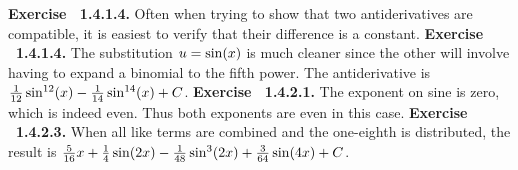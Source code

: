  {\noindent \protect \bf  Exercise ~1.4.1.4.} Often when trying to show that two antiderivatives are compatible, it is easiest to verify that their difference is a constant.  \protect \newline  \protect \newline  
 {\noindent \protect \bf  Exercise ~1.4.1.4.} The substitution $u=\protect \qopname  \relax o{sin}(x)$ is much cleaner since the other will involve having to expand a binomial to the fifth power. The antiderivative is $\protect \frac  {1}{12}\protect \qopname  \relax o{sin}^{12}(x)-\protect \frac  {1}{14}\protect \qopname  \relax o{sin}^{14}(x)+C$. \protect \newline  \protect \newline  
 {\noindent \protect \bf  Exercise ~1.4.2.1.} The exponent on sine is zero, which is indeed even. Thus both exponents are even in this case. \protect \newline  \protect \newline  
 {\noindent \protect \bf  Exercise ~1.4.2.3.} When all like terms are combined and the one-eighth is distributed, the result is $\protect \frac  {5}{16}x+\protect \frac  {1}{4}\protect \qopname  \relax o{sin}(2x)-\protect \frac  {1}{48}\protect \qopname  \relax o{sin}^3(2x)+\protect \frac  {3}{64}\protect \qopname  \relax o{sin}(4x)+C$. \protect \newline  \protect \newline  

